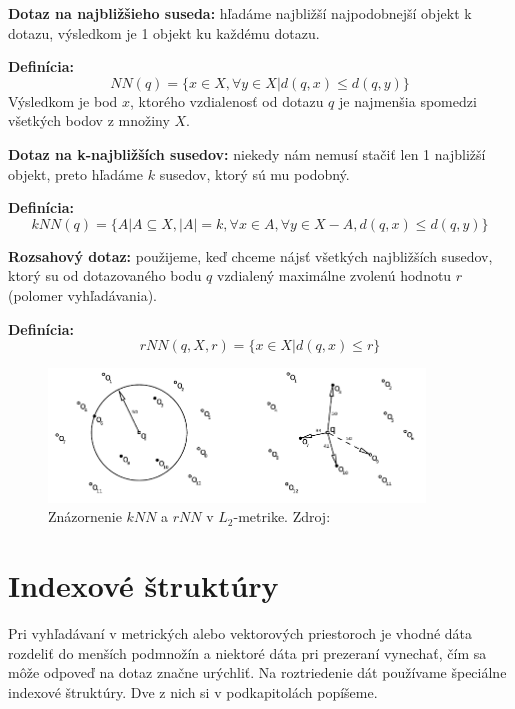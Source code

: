 \documentclass[12pt,a4paper,oneside]{fithesis2}
\begin{document}
   \begin{description}
   \item \textbf{Dotaz na najbližšieho suseda:} hľadáme najbližší najpodobnejší objekt k dotazu, výsledkom je 1 objekt ku každému dotazu.
   
   \textbf{Definícia:}
   \begin{equation*}
   NN(q)=\{x \in X, \forall y \in X| d(q,x)\leq d(q,y) \}
   \end{equation*}
Výsledkom je bod $x$, ktorého vzdialenosť od dotazu $q$ je najmenšia spomedzi všetkých bodov z množiny $X$.
   \item \textbf{Dotaz na k-najbližších susedov:} niekedy nám nemusí stačiť len 1 najbližší objekt, preto hľadáme $k$ susedov, ktorý sú mu podobný.
   
   \textbf{Definícia:}
   \begin{equation*}
   kNN(q)=\{A|A \subseteq X,|A|=k,\forall x \in A,\forall y \in X - A,d(q,x)\leq d(q,y)\}
   \end{equation*}    
   \item \textbf{Rozsahový dotaz:} použijeme, keď chceme nájsť všetkých najbližších susedov, ktorý su od dotazovaného bodu $q$ vzdialený maximálne zvolenú hodnotu $r$ (polomer vyhľadávania).
   
   \textbf{Definícia:} %
   \begin{equation*} 
  rNN(q,X,r)=\{ x \in X|d(q,x)\leq r \}
   \end{equation*}  
   \end{description}
   
	\begin{figure}[h]
  		\centering
  		\includegraphics[width=10cm]{obr/knn.png}
  		\caption{Znázornenie $kNN$ a $rNN$ v $L_2$-metrike. Zdroj:\cite{knnPavelJurkas}}
  		\label{fig:rozdelenie priestoru}
	\end{figure}  

\chapter{Indexové štruktúry}
Pri vyhľadávaní v metrických alebo vektorových priestoroch je vhodné dáta rozdeliť do menších podmnožín a niektoré dáta pri prezeraní vynechať, čím sa môže odpoveď na dotaz značne urýchliť. Na roztriedenie dát používame špeciálne indexové štruktúry. Dve z nich si v podkapitolách popíšeme.
\end{document}
